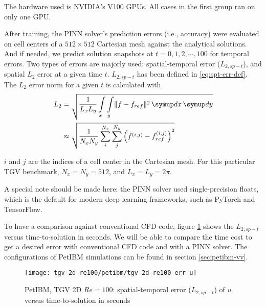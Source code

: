The hardware used is NVIDIA's V100 GPUs.
All cases in the first group ran on only one GPU.

After training, the PINN solver's prediction errors (i.e., accuracy) were evaluated on cell centers of a $512 \times 512$ Cartesian mesh against the analytical solutions.
And if needed, we predict solution snapshots at $t=0, 1, 2, \cdots, 100$ for temporal errors.
Two types of errors are majorly used: spatial-temporal error ($L_{2,sp-t}$), and spatial $L_2$ error at a given time $t$.
$L_{2,sp-t}$ has been defined in \eqref{eq:spt-err-def}.
The $L_2$ error norm for a given $t$ is calculated with
\begin{equation}\label{eq:l2norm}
    \begin{aligned}
        L_2
        &=
        \sqrt{
            \frac{1}{L_x L_y}
            \int\limits_{x}\int\limits_{y} \lVert f - f_{ref}\rVert^2
            \diff x \diff y
        } \\
        &\approx
        \sqrt{
            \frac{1}{N_x N_y}
            \sum\limits_{i}^{N_x}\sum\limits_{j}^{N_y}
            \left(f^{\left(i, j\right)}-f_{ref}^{\left(i, j\right)}\right)^2
        }
    \end{aligned}
\end{equation}

\noindent $i$ and $j$ are the indices of a cell center in the Cartesian mesh.
For this particular TGV benchmark, $N_x=N_y=512$, and $L_x=L_y=2\pi$.

A special note should be made here: the PINN solver used single-precision floats, which is the default for modern deep learning frameworks, such as PyTorch and TensorFlow.

To have a comparison against conventional CFD code, figure \ref{fig:petibm-tgv-spatial-temporal-error} shows the $L_{2,sp-t}$ versus time-to-solution in seconds.
We will be able to compare the time cost to get a desired error with conventional CFD code and with a PINN solver.
The configurations of PetIBM simulations can be found in section \ref{sec:petibm-vv}.

\begin{figure}[hbt!]
    \centering%
    \texttt{[image: tgv-2d-re100/petibm/tgv-2d-re100-err-u]}%
    \caption[%
        PetIBM, TGV 2D $Re=100$: spatial-temporal error ($L_{2,sp-t}$) of $u$%
    ]{%
        PetIBM, TGV 2D $Re=100$: spatial-temporal error ($L_{2,sp-t}$)  of $u$ versus time-to-solution in seconds%
    }\label{fig:petibm-tgv-spatial-temporal-error}%
\end{figure}
